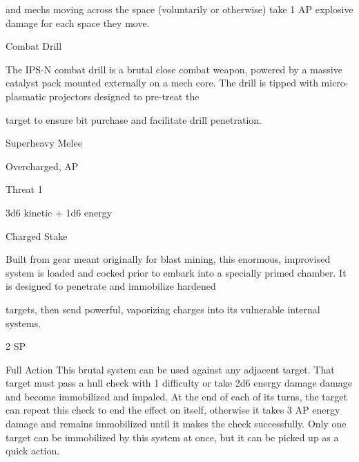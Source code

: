 and mechs moving across the space (voluntarily or otherwise) take 1 AP explosive damage for  
each space they move.
 

Combat Drill  

The IPS-N combat drill is a brutal close combat weapon, powered by a massive catalyst pack mounted  
externally on a mech core. The drill is tipped with micro-plasmatic projectors designed to pre-treat the  

target to ensure bit purchase and facilitate drill penetration.   

Superheavy Melee
 
Overcharged, AP
 
Threat 1
 
3d6 kinetic + 1d6 energy
 

Charged Stake
 

Built from gear meant originally for blast mining, this enormous, improvised system is loaded and cocked  
prior to embark into a specially primed chamber. It is designed to penetrate and immobilize hardened  

targets, then send powerful, vaporizing charges into its vulnerable internal systems.  

2 SP
 

Full Action  
This brutal system can be used against any adjacent target. That target must pass a hull check  
with 1 difficulty or take 2d6 energy damage damage and become immobilized and impaled. At  
the end of each of its turns, the target can repeat this check to end the effect on itself, otherwise  
it takes 3 AP energy damage and remains immobilized until it makes the check successfully. Only  
one target can be immobilized by this system at once, but it can be picked up as a quick action.
 

                                                                                                                    
